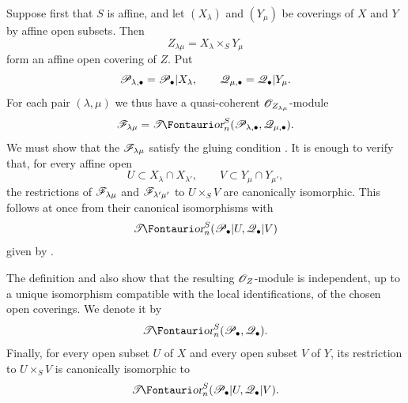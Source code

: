 \begin{env}[6.5.2]
\label{III.6.5.2}
Suppose first that $S$ is affine, and let $(X_\lambda)$ and
$(Y_\mu)$ be coverings of $X$ and $Y$ by affine open subsets.
Then
\[
  Z_{\lambda\mu}=X_\lambda\times_SY_\mu
\]
form an affine open covering of $Z$.  Put
\[
  \mathscr{P}_{\lambda,\bullet}=\mathscr{P}_\bullet|X_\lambda,
  \qquad
  \mathscr{Q}_{\mu,\bullet}=\mathscr{Q}_\bullet|Y_\mu.
\]
For each pair $(\lambda,\mu)$ we thus have a quasi-coherent
$\mathscr{O}_{Z_{\lambda\mu}}$-module
\[
  \sh F_{\lambda\mu}
  =
  \shTor_n^S(\sh P_{\lambda,\bullet},\sh Q_{\mu,\bullet}).
\]
We must show that the $\mathscr{F}_{\lambda\mu}$ satisfy the gluing
condition .  It is enough to verify that, for
every affine open
\[
  U\subset X_\lambda\cap X_{\lambda'},
  \qquad
  V\subset Y_\mu\cap Y_{\mu'},
\]
the restrictions of $\mathscr{F}_{\lambda\mu}$ and
$\mathscr{F}_{\lambda'\mu'}$ to $U\times_SV$ are canonically
isomorphic.  This follows at once from their canonical
isomorphisms with
\[
  \shTor_n^S(\sh P_\bullet|U,\sh Q_\bullet|V)
\]
given by .

The definition and  also show that the resulting
$\mathscr{O}_Z$-module is independent, up to a unique isomorphism
compatible with the local identifications, of the chosen open
coverings.  We denote it by
\[
  \shTor_n^S(\sh P_\bullet,\sh Q_\bullet).
\]
Finally, for every open subset $U$ of $X$ and every open subset
$V$ of $Y$, its restriction to $U\times_SV$ is canonically
isomorphic to
\[
  \shTor_n^S(\sh P_\bullet|U,\sh Q_\bullet|V).
\]
\end{env}

